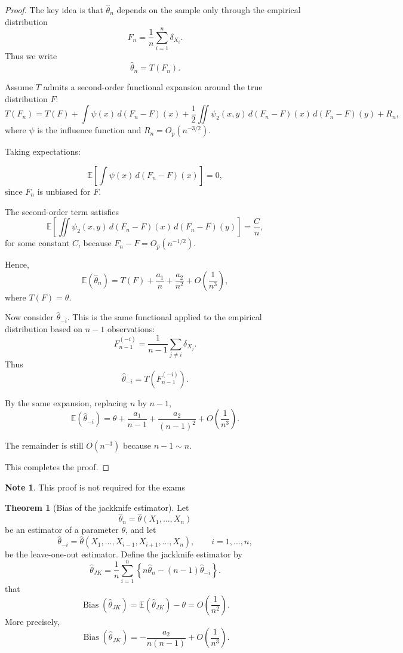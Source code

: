 \documentclass[11pt]{article}
\theoremstyle{definition}
\newtheorem{note}{Note}[section]
\newtheorem{theo}{Theorem}[section]
\begin{document}
\begin{proof}
The key idea is that \(\hat\theta_n\) depends on the sample only through the empirical distribution
\[
F_n = \frac{1}{n}\sum_{i=1}^n \delta_{X_i}.
\]
Thus we write
\[
\hat\theta_n = T(F_n).
\]

Assume \(T\) admits a second-order functional expansion around the true distribution \(F\):
\[
T(F_n)
=
T(F)
+ \int \psi(x)\, d(F_n - F)(x)
+ \frac{1}{2}\iint \psi_2(x,y)\, d(F_n - F)(x)\, d(F_n - F)(y)
+ R_n,
\]
where \(\psi\) is the influence function and \(R_n = O_p(n^{-3/2})\).

Taking expectations:

\[
\mathbb E\left[\int \psi(x)\, d(F_n - F)(x)\right] = 0,
\]
since \(F_n\) is unbiased for \(F\).

The second-order term satisfies
\[
\mathbb E\left[\iint \psi_2(x,y)\, d(F_n - F)(x)\, d(F_n - F)(y)\right]
=
\frac{C}{n},
\]
for some constant \(C\), because \(F_n - F = O_p(n^{-1/2})\).

Hence,
\[
\mathbb E(\hat\theta_n)
=
T(F) + \frac{a_1}{n} + \frac{a_2}{n^2} + O\!\left(\frac{1}{n^3}\right),
\]
where \(T(F)=\theta\).

Now consider \(\hat\theta_{-i}\). This is the same functional applied to the empirical distribution based on \(n-1\) observations:
\[
F_{n-1}^{(-i)} = \frac{1}{n-1}\sum_{j\ne i} \delta_{X_j}.
\]
Thus
\[
\hat\theta_{-i} = T(F_{n-1}^{(-i)}).
\]

By the same expansion, replacing \(n\) by \(n-1\),
\[
\mathbb E(\hat\theta_{-i})
=
\theta + \frac{a_1}{n-1} + \frac{a_2}{(n-1)^2} + O\!\left(\frac{1}{n^3}\right).
\]

The remainder is still \(O(n^{-3})\) because \(n-1 \sim n\).

This completes the proof.
\end{proof}
\begin{note}
    This proof is not required for the exams
\end{note}
\begin{theo}[Bias of the jackknife estimator]
Let
\[
\hat\theta_n=\hat\theta(X_1,\dots,X_n)
\]
be an estimator of a parameter \(\theta\), and let
\[
\hat\theta_{-i}
=
\hat\theta(X_1,\dots,X_{i-1},X_{i+1},\dots,X_n),
\qquad i=1,\dots,n,
\]
be the leave-one-out estimator. Define the jackknife estimator by
\[
\hat\theta_{JK}
=
\frac{1}{n}\sum_{i=1}^n \left\{n\hat\theta_n-(n-1)\hat\theta_{-i}\right\}.
\]
that
\[
\operatorname{Bias}(\hat\theta_{JK})
=
\mathbb E(\hat\theta_{JK})-\theta
=
O\!\left(\frac{1}{n^2}\right).
\]
More precisely,
\[
\operatorname{Bias}(\hat\theta_{JK})
=
-\frac{a_2}{n(n-1)}+O\!\left(\frac{1}{n^3}\right).
\]
\end{theo}
\end{document}
